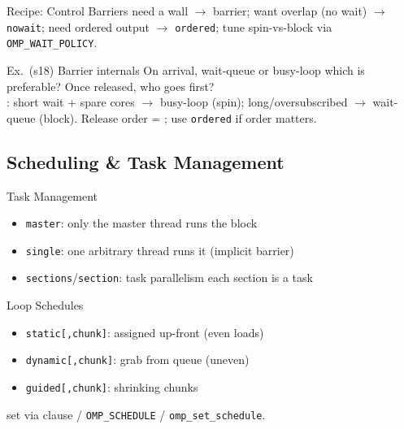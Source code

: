 \multend

\begin{KR}{Recipe: Control Barriers}
    need a wall $\to$ barrier; want overlap (no wait) $\to$ \texttt{nowait}; need ordered output $\to$ \texttt{ordered}; tune spin-vs-block via \texttt{OMP\_WAIT\_POLICY}.
\end{KR}

\begin{example2}{Ex.\ (s18) Barrier internals}
    On arrival, wait-queue or busy-loop which is preferable? Once released, who goes first?
     \\ 
    : short wait + spare cores $\to$ busy-loop (spin); long/oversubscribed $\to$ wait-queue (block). Release order = ; use \texttt{ordered} if order matters.
\end{example2}

\subsection{Scheduling \& Task Management}


\begin{concept}{Task Management}
    \begin{itemize}
        \item \texttt{master}: only the master thread runs the block
        \item \texttt{single}: one arbitrary thread runs it (implicit barrier)
        \item \texttt{sections}/\texttt{section}: task parallelism each section is a task
    \end{itemize}
\end{concept}

\begin{definition}{Loop Schedules}
    \begin{itemize}
        \item \texttt{static[,chunk]}: assigned up-front (even loads)
        \item \texttt{dynamic[,chunk]}: grab from queue (uneven)
        \item \texttt{guided[,chunk]}: shrinking chunks
    \end{itemize}
    set via clause / \texttt{OMP\_SCHEDULE} / \texttt{omp\_set\_schedule}.
\end{definition}

\multend


